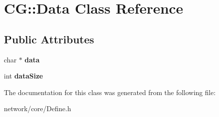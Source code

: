 \hypertarget{class_c_g_1_1_data}{}\section{CG\+:\+:Data Class Reference}
\label{class_c_g_1_1_data}
\subsection*{Public Attributes}
\begin{DoxyCompactItemize}
\item 
\mbox{\label{class_c_g_1_1_data_a1632ab44526402f3b1a4af3e2b5d7ebe}} 
char $\ast$ {\bfseries data}
\item 
\mbox{\label{class_c_g_1_1_data_afa740e2ccb4794aa944fc1eaa6c4c21d}} 
int {\bfseries data\+Size}
\end{DoxyCompactItemize}


The documentation for this class was generated from the following file\+:\begin{DoxyCompactItemize}
\item 
network/core/Define.\+h\end{DoxyCompactItemize}
